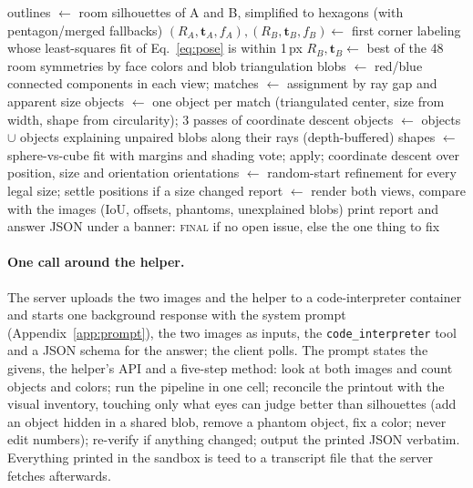 \documentclass[10pt,a4paper]{article}
\begin{document}
\begin{algorithm}[t]
\caption{\texttt{solve\_all}: the helper's pipeline (no model in the loop)}
\label{alg:solve}
\begin{algorithmic}[1]
\State outlines $\gets$ room silhouettes of A and B, simplified to hexagons (with pentagon/merged fallbacks)
\State $(R_A,\mathbf{t}_A,f_A),(R_B,\mathbf{t}_B,f_B)\gets$ first corner labeling whose least-squares fit of Eq.~\eqref{eq:pose} is within 1\,px
\State $R_B,\mathbf{t}_B\gets$ best of the 48 room symmetries by face colors and blob triangulation
\State blobs $\gets$ red/blue connected components in each view; matches $\gets$ assignment by ray gap and apparent size
\State objects $\gets$ one object per match (triangulated center, size from width, shape from circularity); 3 passes of coordinate descent
\State objects $\gets$ objects $\cup$ objects explaining unpaired blobs along their rays (depth-buffered)
\State shapes $\gets$ sphere-vs-cube fit with margins and shading vote; apply; coordinate descent over position, size and orientation
\State orientations $\gets$ random-start refinement for every legal size; settle positions if a size changed
\State report $\gets$ render both views, compare with the images (IoU, offsets, phantoms, unexplained blobs)
\State print report and answer JSON under a banner: \textsc{final} if no open issue, else the one thing to fix
\end{algorithmic}
\end{algorithm}

\paragraph{One call around the helper.}
The server uploads the two images and the helper to a code-interpreter container and starts one background response with the system prompt (Appendix~\ref{app:prompt}), the two images as inputs, the \texttt{code\_interpreter} tool and a JSON schema for the answer; the client polls. The prompt states the givens, the helper's API and a five-step method: look at both images and count objects and colors; run the pipeline in one cell; reconcile the printout with the visual inventory, touching only what eyes can judge better than silhouettes (add an object hidden in a shared blob, remove a phantom object, fix a color; never edit numbers); re-verify if anything changed; output the printed JSON verbatim. Everything printed in the sandbox is teed to a transcript file that the server fetches afterwards.
\end{document}
